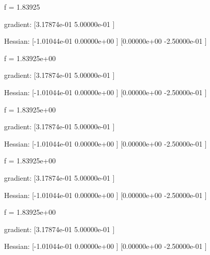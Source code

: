 \documentclass[12pt,a4paper]{article}
\begin{document}
\begin{myoutput}
f = 1.83925

gradient:
[3.17874e-01    5.00000e-01    ]

Hessian:
[-1.01044e-01   0.00000e+00    ]
[0.00000e+00    -2.50000e-01   ]


f = 1.83925e+00

gradient:
[3.17874e-01    5.00000e-01    ]

Hessian:
[-1.01044e-01   0.00000e+00    ]
[0.00000e+00    -2.50000e-01   ]


f = 1.83925e+00

gradient:
[3.17874e-01    5.00000e-01    ]

Hessian:
[-1.01044e-01   0.00000e+00    ]
[0.00000e+00    -2.50000e-01   ]


f = 1.83925e+00

gradient:
[3.17874e-01    5.00000e-01    ]

Hessian:
[-1.01044e-01   0.00000e+00    ]
[0.00000e+00    -2.50000e-01   ]


f = 1.83925e+00

gradient:
[3.17874e-01    5.00000e-01    ]

Hessian:
[-1.01044e-01   0.00000e+00    ]
[0.00000e+00    -2.50000e-01   ]
\end{myoutput}
\newpage
\end{document}
